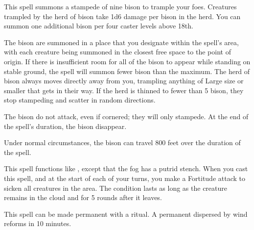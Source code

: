 \spellrng{\rngfar}
\begin{spelleffect}
  This spell summons a stampede of nine bison to trample your foes. Creatures trampled by the herd of bison take 1d6 damage per bison in the herd. You can summon one additional bison per four caster levels above 18th.
  \par The bison are summoned in a place that you designate within the spell's area, with each creature being summoned in the closest free space to the point of origin. If there is insufficient room for all of the bison to appear while standing on stable ground, the spell will summon fewer bison than the maximum. The herd of bison always moves directly away from you, trampling anything of Large size or smaller that gets in their way. If the herd is thinned to fewer than 5 bison, they stop stampeding and scatter in random directions.
  \par The bison do not attack, even if cornered; they will only stampede. At the end of the spell's duration, the bison disappear.
\end{spelleffect}
\begin{spellnotes}
  Under normal circumstances, the bison can travel 800 feet over the duration of the spell.
\end{spellnotes}

\begin{spelleffect}
  This spell functions like , except that the fog has a putrid stench. When you cast this spell, and at the start of each of your turns, you make a Fortitude attack to sicken all creatures in the area. The condition lasts as long as the creature remains in the cloud and for 5 rounds after it leaves.
\end{spelleffect}
\begin{spellnotes}
   This spell can be made permanent with a  ritual. A permanent  dispersed by wind reforms in 10 minutes.
\end{spellnotes}

